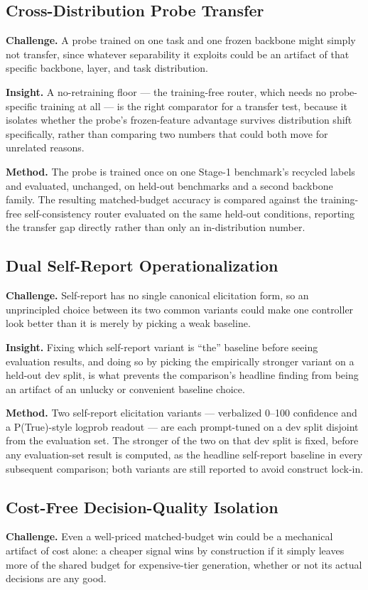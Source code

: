 \documentclass[11pt]{article}
\begin{document}
\subsection{Cross-Distribution Probe Transfer}
\textbf{Challenge.} A probe trained on one task and one frozen backbone might simply not transfer, since whatever separability it exploits could be an artifact of that specific backbone, layer, and task distribution.

\textbf{Insight.} A no-retraining floor --- the training-free router, which needs no probe-specific training at all --- is the right comparator for a transfer test, because it isolates whether the probe's frozen-feature advantage survives distribution shift specifically, rather than comparing two numbers that could both move for unrelated reasons.

\textbf{Method.} The probe is trained once on one Stage-1 benchmark's recycled labels and evaluated, unchanged, on held-out benchmarks and a second backbone family. The resulting matched-budget accuracy is compared against the training-free self-consistency router evaluated on the same held-out conditions, reporting the transfer gap directly rather than only an in-distribution number.

\subsection{Dual Self-Report Operationalization}
\textbf{Challenge.} Self-report has no single canonical elicitation form, so an unprincipled choice between its two common variants could make one controller look better than it is merely by picking a weak baseline.

\textbf{Insight.} Fixing which self-report variant is ``the'' baseline before seeing evaluation results, and doing so by picking the empirically stronger variant on a held-out dev split, is what prevents the comparison's headline finding from being an artifact of an unlucky or convenient baseline choice.

\textbf{Method.} Two self-report elicitation variants --- verbalized 0--100 confidence and a P(True)-style logprob readout --- are each prompt-tuned on a dev split disjoint from the evaluation set. The stronger of the two on that dev split is fixed, before any evaluation-set result is computed, as the headline self-report baseline in every subsequent comparison; both variants are still reported to avoid construct lock-in.

\subsection{Cost-Free Decision-Quality Isolation}
\textbf{Challenge.} Even a well-priced matched-budget win could be a mechanical artifact of cost alone: a cheaper signal wins by construction if it simply leaves more of the shared budget for expensive-tier generation, whether or not its actual decisions are any good.
\end{document}
